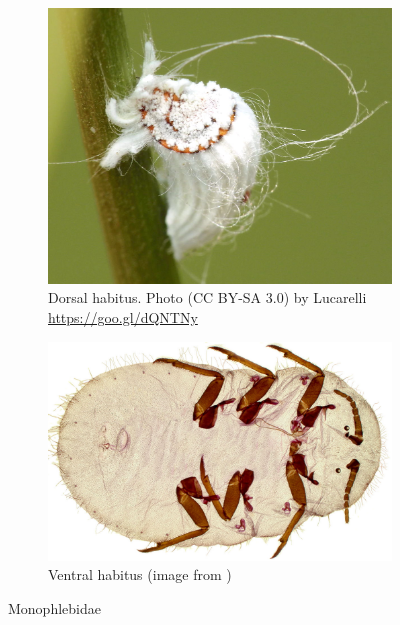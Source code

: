 \documentclass[letterpaper, 11pt]{article}
\begin{document}
\begin{figure}[ht!]
 \centering
 \begin{subfigure}[ht!]{0.42\textwidth}
  \includegraphics[width=\textwidth]{MonophlebidDorsalHabitus}
  \caption{Dorsal habitus. Photo (CC BY-SA 3.0) by Lucarelli \url{https://goo.gl/dQNTNy}}
  \label{fig:monophlebid1}
 \end{subfigure}
 \qquad
 \begin{subfigure}[ht!]{0.45\textwidth}
  \includegraphics[width=\textwidth]{MonophlebidHabitus}
  \caption{Ventral habitus (image from \cite{ScaleNet})}
  \label{fig:monophlebid2}
 \end{subfigure}
 \caption{Monophlebidae}\label{fig:monophlebids}
\end{figure}
\end{document}
